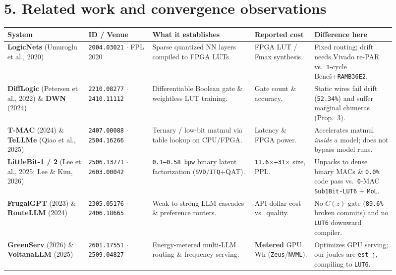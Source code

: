 \documentclass[10pt]{article}
\begin{document}
\section{5. Related work and convergence observations}\label{related-work}

{\footnotesize\setlength{\tabcolsep}{3.5pt}
\begin{longtable}{@{}L{0.19\linewidth}L{0.15\linewidth}L{0.24\linewidth}L{0.14\linewidth}L{0.19\linewidth}@{}}
\toprule
\textbf{System} & \textbf{ID / Venue} & \textbf{What it establishes} & \textbf{Reported cost} & \textbf{Difference here} \\
\midrule
\endhead
\textbf{LogicNets} (Umuroglu et al., 2020) & \texttt{2004.03021} $\cdot$ FPL 2020 & Sparse quantized NN layers compiled to FPGA LUTs. & FPGA LUT / Fmax synthesis. & Fixed routing; drift needs Vivado re-PAR vs.\ \texttt{1}-cycle Bene\v{s}+\texttt{RAMB36E2}. \\
\addlinespace[3pt]
\textbf{DiffLogic} (Petersen et al., 2022) \& \textbf{DWN} (2024) & \texttt{2210.08277} $\cdot$ \texttt{2410.11112} & Differentiable Boolean gate \& weightless LUT training. & Gate count \& accuracy. & Static wires fail drift (\texttt{52.34\%}) and suffer marginal chimeras (Prop.\ 3). \\
\addlinespace[3pt]
\textbf{T-MAC} (2024) \& \textbf{TeLLMe} (Qiao et al., 2025) & \texttt{2407.00088} $\cdot$ \texttt{2504.16266} & Ternary / low-bit matmul via table lookup on CPU/FPGA. & Latency \& FPGA power. & Accelerates matmul \emph{inside} a model; does not bypass model runs. \\
\addlinespace[3pt]
\textbf{LittleBit-1 / 2} (Lee et al., 2025; Lee \& Kim, 2026) & \texttt{2506.13771} $\cdot$ \texttt{2603.00042} & \texttt{0.1--0.58 bpw} binary latent factorization (\texttt{SVD}/\texttt{ITQ}+QAT). & \texttt{11.6$\times$--31$\times$} size, PPL. & Unpacks to dense binary MACs \& \texttt{0.0\%} code pass vs.\ \texttt{0}-MAC \texttt{Sub1Bit-LUT6} + \texttt{MoL}. \\
\addlinespace[3pt]
\textbf{FrugalGPT} (2023) \& \textbf{RouteLLM} (2024) & \texttt{2305.05176} $\cdot$ \texttt{2406.18665} & Weak-to-strong LLM cascades \& preference routers. & API dollar cost vs.\ quality. & No $C(z)$ gate (\texttt{89.6\%} broken commits) and no \texttt{LUT6} downward compiler. \\
\addlinespace[3pt]
\textbf{GreenServ} (2026) \& \textbf{VoltanaLLM} (2025) & \texttt{2601.17551} $\cdot$ \texttt{2509.04827} & Energy-metered multi-LLM routing \& frequency serving. & \textbf{Metered} GPU Wh (\texttt{Zeus}/\texttt{NVML}). & Optimizes GPU serving; our joules are \texttt{est\_j}, compiling to \texttt{LUT6}. \\

\end{longtable}}
\end{document}
